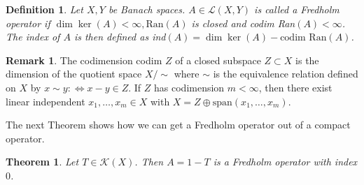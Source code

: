 \documentclass[11pt,a4paper]{article}
\newtheorem{thm}{Theorem}[section]
\newtheorem{defn}{Definition}[section]
\theoremstyle{definition}
\newtheorem{rem}{Remark}[section]
\begin{document}
\begin{defn} Let $X,Y$ be Banach spaces. $A \in \mathcal{L}(X,Y)$ is called a Fredholm operator if $\dim \ker (A) < \infty, \text{Ran}(A)$ is closed and codim Ran$(A) < \infty$. The index of $A$ is then defined as ind$(A)= \dim \ker(A)- \text{codim Ran}(A)$. 
\end{defn}
\begin{rem} The codimension codim $Z$ of a closed subspace $Z \subset X$ is the dimension of the quotient space $X/\sim$ where $\sim$ is the equivalence relation defined on $X$ by $x \sim y : \iff x-y \in Z$. If $Z$ has codimension $m < \infty$, then there exist linear independent $x_1, \dots , x_m \in X$ with $X= Z \oplus \text{span}(x_1, \dots , x_m)$. 
\end{rem}
The next Theorem shows how we can get a Fredholm operator out of a compact operator.
\newpage
\begin{thm} Let $T \in \mathcal{K}(X)$. Then $A=1-T$ is a Fredholm operator with index $0$. 
\end{thm}
\end{document}
